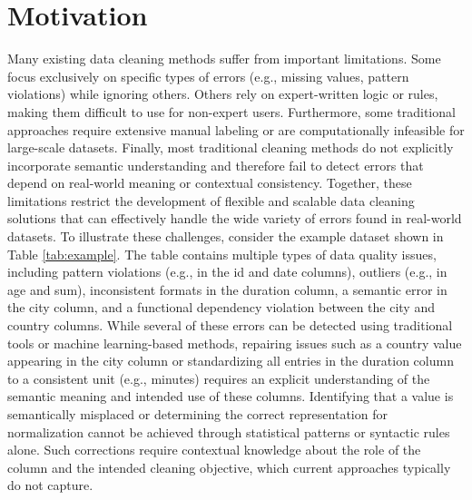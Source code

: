 \section{Motivation}
Many existing data cleaning methods suffer from important limitations. 
Some focus exclusively on specific types of errors (e.g., missing values, pattern violations) while ignoring others. 
Others rely on expert-written logic or rules, making them difficult to use for non-expert users. 
Furthermore, some traditional approaches require extensive manual labeling or are computationally infeasible for large-scale datasets. 
Finally, most traditional cleaning methods do not explicitly incorporate semantic understanding and therefore fail to detect errors that depend on real-world meaning or contextual consistency.
Together, these limitations restrict the development of flexible and scalable data cleaning solutions that can effectively handle the wide variety of errors found in real-world datasets.
\newline\newline
To illustrate these challenges, consider the example dataset shown in Table \ref{tab:example}. 
The table contains multiple types of data quality issues, including pattern violations (e.g., in the id and date columns), outliers (e.g., in age and sum), inconsistent formats in the duration column, a semantic error in the city column, and a functional dependency violation between the city and country columns.
While several of these errors can be detected using traditional tools or machine learning-based methods, repairing issues such as a country value appearing in the city column or standardizing all entries in the duration column to a consistent unit (e.g., minutes) requires an explicit understanding of the semantic meaning and intended use of these columns.
Identifying that a value is semantically misplaced or determining the correct representation for normalization cannot be achieved through statistical patterns or syntactic rules alone.
Such corrections require contextual knowledge about the role of the column and the intended cleaning objective, which current approaches typically do not capture.

